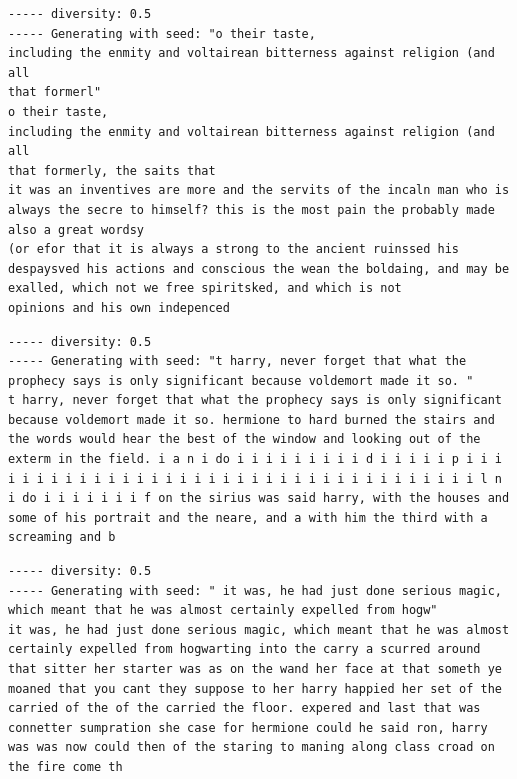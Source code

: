 \documentclass{article}[]
\begin{document}
\begin{lstlisting}[label=nietzsche-adjusted-low-diverse, caption={adjusted original script with Nietzsche after 60 epochs and a diversity of 0.5}]
----- diversity: 0.5
----- Generating with seed: "o their taste,
including the enmity and voltairean bitterness against religion (and all
that formerl"
o their taste,
including the enmity and voltairean bitterness against religion (and all
that formerly, the saits that
it was an inventives are more and the servits of the incaln man who is always the secre to himself? this is the most pain the probably made also a great wordsy
(or efor that it is always a strong to the ancient ruinssed his despaysved his actions and conscious the wean the boldaing, and may be exalled, which not we free spiritsked, and which is not
opinions and his own indepenced
\end{lstlisting}


\begin{lstlisting}[label=harry-adjusted-low-diverse, caption={adjusted original script with Harry Potter after 7 epochs and a diversity of 0.5}]
----- diversity: 0.5
----- Generating with seed: "t harry, never forget that what the prophecy says is only significant because voldemort made it so. "
t harry, never forget that what the prophecy says is only significant because voldemort made it so. hermione to hard burned the stairs and the words would hear the best of the window and looking out of the exterm in the field. i a n i do i i i i i i i i i d i i i i i p i i i i i i i i i i i i i i i i i i i i i i i i i i i i i i i i i i i i l n i do i i i i i i i f on the sirius was said harry, with the houses and some of his portrait and the neare, and a with him the third with a screaming and b
\end{lstlisting}


\begin{lstlisting}[label=harry-gru-low-diverse, caption={script with GRU and with Harry Potter as input after 1 epoch and a diversity of 0.5}]
----- diversity: 0.5
----- Generating with seed: " it was, he had just done serious magic, which meant that he was almost certainly expelled from hogw"
it was, he had just done serious magic, which meant that he was almost certainly expelled from hogwarting into the carry a scurred around that sitter her starter was as on the wand her face at that someth ye moaned that you cant they suppose to her harry happied her set of the carried of the of the carried the floor. expered and last that was connetter sumpration she case for hermione could he said ron, harry was was now could then of the staring to maning along class croad on the fire come th
\end{lstlisting}
\end{document}
